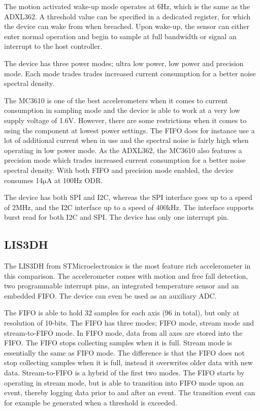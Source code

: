 The motion activated wake-up mode operates at 6Hz, which is the same as the ADXL362. A threshold value can be specified in a dedicated register, for which the device can wake from when breached. Upon wake-up, the sensor can either enter normal operation and begin to sample at full bandwidth or signal an interrupt to the host controller.

The device has three power modes; ultra low power, low power and precision mode. Each mode trades trades increased current consumption for a better noise spectral density. 

The MC3610 is one of the best accelerometers when it comes to current consumption in sampling mode and the device is able to work at a very low supply voltage of 1.6V. However, there are some restrictions when it comes to using the component at lowest power settings. The FIFO does for instance use a lot of additional current when in use and the spectral noise is fairly high when operating in low power mode. As the ADXL362, the MC3610 also features a precision mode which trades increased current consumption for a better noise spectral density. With both FIFO and precision mode enabled, the device consumes 14$\si{\micro\ampere}$ at 100Hz ODR. 

The device has both SPI and I2C, whereas the SPI interface goes up to a speed of 2MHz, and the I2C interface up to a speed of 400kHz. The interface supports burst read for both I2C and SPI. The device has only one interrupt pin.

\subsection{LIS3DH}

The LIS3DH from STMicroelectronics is the most feature rich accelerometer in this comparison. The accelerometer comes with motion and free fall detection, two programmable interrupt pins, an integrated temperature sensor and an embedded FIFO. The device can even be used as an auxiliary ADC.

The FIFO is able to hold 32 samples for each axis (96 in total), but only at resolution of 10-bits. The FIFO has three modes; FIFO mode, stream mode and stream-to-FIFO mode. In FIFO mode, data from all axes are stored into the FIFO. The FIFO stops collecting samples when it is full. Stream mode is essentially the same as FIFO mode. The difference is that the FIFO does not stop collecting samples when it is full, instead it overwrites older data with new data. Stream-to-FIFO is a hybrid of the first two modes. The FIFO starts by operating in stream mode, but is able to transition into FIFO mode upon an event, thereby logging data prior to and after an event. The transition event can for example be generated when a threshold is exceeded.

